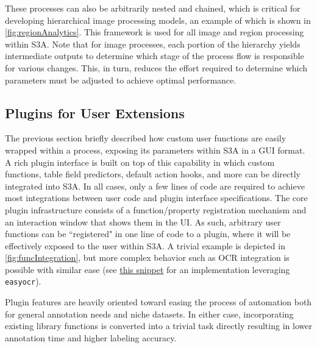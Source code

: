 These processes can also be arbitrarily nested and chained, which is critical for developing hierarchical image processing models, an example of which is shown in \autoref{fig:regionAnalytics}.
This framework is used for all image and region processing within S3A.
Note that for image processes, each portion of the hierarchy yields intermediate outputs to determine which stage of the process flow is responsible for various changes.
This, in turn, reduces the effort required to determine which parameters must be adjusted to achieve optimal performance.

\makeRegionAnalyticsFig

\subsection{Plugins for User Extensions}\label{sec:plugins}
The previous section briefly described how custom user functions are easily wrapped within a process, exposing its parameters within S3A in a GUI format.
A rich plugin interface is built on top of this capability in which custom functions, table field predictors, default action hooks, and more can be directly integrated into S3A.
In all cases, only a few lines of code are required to achieve most integrations between user code and plugin interface specifications.
The core plugin infrastructure consists of a function/property registration mechanism and an interaction window that shows them in the UI.
As such, arbitrary user functions can be ``registered" in one line of code to a plugin, where it will be effectively exposed to the user within S3A.
A trivial example is depicted in \autoref{fig:funcIntegration}, but more complex behavior such as OCR integration is possible with similar ease (see \href{https://gitlab.com/s3a/s3a/-/snippets/2203628}{this snippet} for an implementation leveraging \texttt{easyocr}).

\makeFuncIntegrationFig

Plugin features are heavily oriented toward easing the process of automation both for general annotation needs and niche datasets.
In either case, incorporating existing library functions is converted into a trivial task directly resulting in lower annotation time and higher labeling accuracy.

